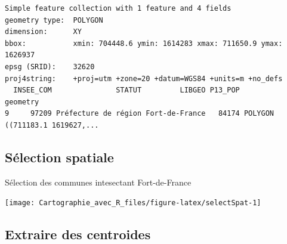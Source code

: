 \documentclass[]{book}
\newenvironment{Shaded}{\begin{snugshade}}{\end{snugshade}}
\newcommand{\KeywordTok}[1]{\textcolor[rgb]{0.13,0.29,0.53}{\textbf{#1}}}
\newcommand{\DataTypeTok}[1]{\textcolor[rgb]{0.13,0.29,0.53}{#1}}
\newcommand{\DecValTok}[1]{\textcolor[rgb]{0.00,0.00,0.81}{#1}}
\newcommand{\StringTok}[1]{\textcolor[rgb]{0.31,0.60,0.02}{#1}}
\newcommand{\CommentTok}[1]{\textcolor[rgb]{0.56,0.35,0.01}{\textit{#1}}}
\newcommand{\OtherTok}[1]{\textcolor[rgb]{0.56,0.35,0.01}{#1}}
\newcommand{\OperatorTok}[1]{\textcolor[rgb]{0.81,0.36,0.00}{\textbf{#1}}}
\newcommand{\NormalTok}[1]{#1}
\begin{document}
\begin{Shaded}
\end{Shaded}

\begin{verbatim}
Simple feature collection with 1 feature and 4 fields
geometry type:  POLYGON
dimension:      XY
bbox:           xmin: 704448.6 ymin: 1614283 xmax: 711650.9 ymax: 1626937
epsg (SRID):    32620
proj4string:    +proj=utm +zone=20 +datum=WGS84 +units=m +no_defs
  INSEE_COM               STATUT         LIBGEO P13_POP                       geometry
9     97209 Préfecture de région Fort-de-France   84174 POLYGON ((711183.1 1619627,...
\end{verbatim}

\subsection{Sélection spatiale}\label{selection-spatiale}

Sélection des communes intesectant Fort-de-France

\begin{Shaded}
\end{Shaded}

\begin{center}\texttt{[image: Cartographie\_avec\_R\_files/figure-latex/selectSpat-1]} \end{center}

\subsection{Extraire des centroides}\label{extraire-des-centroides}
\end{document}
